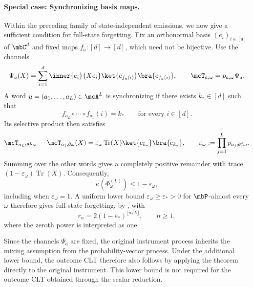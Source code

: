 \documentclass[a4paper]{article}
\numberwithin{equation}{section}   %
\theoremstyle{plain}   %
\theoremstyle{plain}   %
\theoremstyle{examplestyle}
\DeclareMathOperator{\pr}{\mbP}           %
\begin{document}
    \paragraph{Special case: Synchronizing basis maps.}
    \label{par:synchronizing-basis-maps}
        Within the preceding family of state-independent emissions, we now give a sufficient condition for full-state forgetting.
        Fix an orthonormal basis $(e_i)_{i\in[d]}$ of $\mbC^d$ and fixed maps $f_a:[d]\to[d]$, which need not be bijective.
        Use the channels
        \[
             \Psi_a(X)
             =\sum_{i=1}^d\inner{e_i}{Xe_i}
                          \ket{e_{f_a(i)}}\bra{e_{f_a(i)}},
             \qquad
             \mcT_{a;\omega}=p_{a;\omega}\Psi_a.
        \]
        A word $u=(a_1,\ldots,a_L)\in\mcA^L$ is synchronizing if  there exists $k_*\in[d]$ such that
        \[
             f_{a_L}\circ\cdots\circ f_{a_1}(i)=k_*
             \qquad\text{for every }i\in[d].
        \]
        Its selective product then satisfies
        \[
         \mcT_{a_L;\theta^L\omega}\cdots
         \mcT_{a_1;\theta\omega}(X)
         =\varepsilon_\omega\operatorname{Tr}(X)
            \ket{e_{k_*}}\bra{e_{k_*}},
         \qquad
         \varepsilon_\omega
         :=\prod_{j=1}^L p_{a_j;\theta^j\omega}.
        \]
        Summing over the other words gives a completely positive remainder with trace $(1-\varepsilon_\omega)\operatorname{Tr}(X)$.
        Consequently,
        \[
         \kappa(\Phi_\omega^{(L)})\le1-\varepsilon_\omega,
        \]
        including when $\varepsilon_\omega=1$.
        A uniform lower bound $\varepsilon_\omega\ge\varepsilon_*>0$ for $\pr$-almost every $\omega$ therefore gives full-state forgetting, by , with
        \[
             r_n=2(1-\varepsilon_*)^{\lfloor n/L\rfloor},
             \qquad n\ge1,
        \]
        where the zeroth power is interpreted as one.

        Since the channels $\Psi_a$ are fixed, the original instrument process inherits the mixing assumption from the probability-vector process. 
        Under the additional lower bound, the outcome CLT therefore also follows by applying the theorem directly to the original instrument.
        This lower bound is not required for the outcome CLT obtained through the scalar reduction.
    
\end{document}
